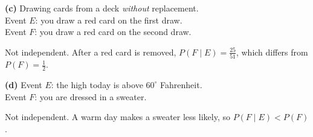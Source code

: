 \documentclass[12pt]{ximera}
\begin{document}
\begin{problem}
\begin{prompt}
\textbf{(c)} Drawing cards from a deck \emph{without} replacement. \\
Event $E$: you draw a red card on the first draw. \\
Event $F$: you draw a red card on the second draw.

\begin{multipleChoice}
\end{multipleChoice}

\begin{feedback}
Not independent. After a red card is removed, $P(F\mid E)=\frac{25}{51}$, which differs
from $P(F)=\frac12$.
\end{feedback}
\end{prompt}

\begin{prompt}
\textbf{(d)} Event $E$: the high today is above $60^\circ$ Fahrenheit. \\
Event $F$: you are dressed in a sweater.

\begin{multipleChoice}
\end{multipleChoice}

\begin{feedback}
Not independent. A warm day makes a sweater less likely, so $P(F\mid E)<P(F)$.
\end{feedback}
\end{prompt}
\end{problem}
\end{document}
